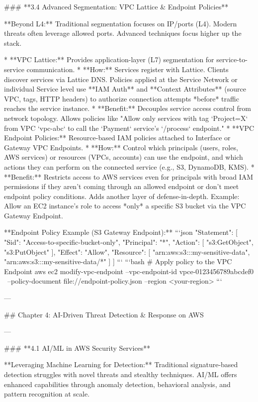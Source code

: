 \documentclass{article}
\begin{document}
### **3.4 Advanced Segmentation: VPC Lattice & Endpoint Policies**

**Beyond L4:** Traditional segmentation focuses on IP/ports (L4). Modern threats often leverage allowed ports. Advanced techniques focus higher up the stack.

* **VPC Lattice:** Provides application-layer (L7) segmentation for service-to-service communication.
    * **How:** Services register with Lattice. Clients discover services via Lattice DNS. Policies applied at the Service Network or individual Service level use **IAM Auth** and **Context Attributes** (source VPC, tags, HTTP headers) to authorize connection attempts *before* traffic reaches the service instance.
    * **Benefit:** Decouples service access control from network topology. Allows policies like "Allow only services with tag `Project=X` from VPC `vpc-abc` to call the `Payment` service's `/process` endpoint."
* **VPC Endpoint Policies:** Resource-based IAM policies attached to Interface or Gateway VPC Endpoints.
    * **How:** Control which principals (users, roles, AWS services) or resources (VPCs, accounts) can use the endpoint, and which actions they can perform on the connected service (e.g., S3, DynamoDB, KMS).
    * **Benefit:** Restricts access to AWS services even for principals with broad IAM permissions if they aren't coming through an allowed endpoint or don't meet endpoint policy conditions. Adds another layer of defense-in-depth. Example: Allow an EC2 instance's role to access *only* a specific S3 bucket via the VPC Gateway Endpoint.

**Endpoint Policy Example (S3 Gateway Endpoint):**
```json
{
  "Statement": [
    {
      "Sid": "Access-to-specific-bucket-only",
      "Principal": "*",
      "Action": [
        "s3:GetObject",
        "s3:PutObject"
      ],
      "Effect": "Allow",
      "Resource": [
        "arn:aws:s3:::my-sensitive-data",
        "arn:aws:s3:::my-sensitive-data/*"
      ]
    }
  ]
}
```
```bash
# Apply policy to the VPC Endpoint
aws ec2 modify-vpc-endpoint --vpc-endpoint-id vpce-0123456789abcdef0 \
  --policy-document file://endpoint-policy.json --region <your-region>
```

---

## Chapter 4: AI-Driven Threat Detection & Response on AWS

---

### **4.1 AI/ML in AWS Security Services**

**Leveraging Machine Learning for Detection:** Traditional signature-based detection struggles with novel threats and stealthy techniques. AI/ML offers enhanced capabilities through anomaly detection, behavioral analysis, and pattern recognition at scale.
\end{document}

